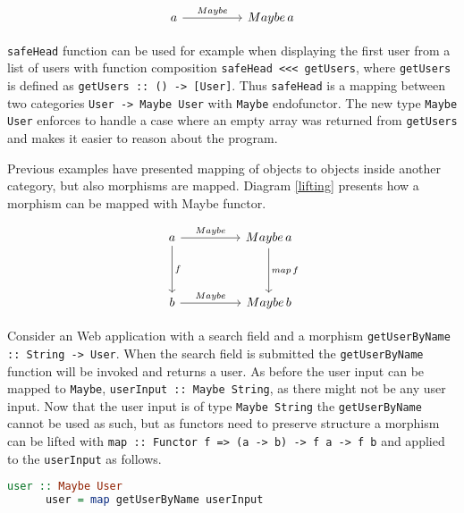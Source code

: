 \documentclass[article]{aaltoseries}
\begin{document}
    \begin{equation}
      \label{mapping}
      \begin{tikzcd}[row sep=huge, column sep=huge]
        a \arrow[r, "Maybe"]
        & Maybe\, a
      \end{tikzcd}
    \end{equation}

    \lstinline|safeHead| function can be used for example when displaying the
    first user from a list of users with function composition
    \lstinline|safeHead <<< getUsers|, where \lstinline|getUsers| is defined as
    \lstinline|getUsers :: () -> [User]|. Thus \lstinline|safeHead| is a mapping
    between two categories \lstinline|User -> Maybe User| with \lstinline|Maybe|
    endofunctor. The new type \lstinline|Maybe User| enforces to handle a case
    where an empty array was returned from \lstinline|getUsers| and makes it
    easier to reason about the program.

    Previous examples have presented mapping of objects to objects inside
    another category, but also morphisms are mapped. Diagram \ref{lifting}
    presents how a morphism can be mapped with Maybe functor.

    \begin{equation}
      \label{lifting}
      \begin{tikzcd}[row sep=huge, column sep=huge]
        a \arrow[r, "Maybe"]
        \arrow[d, "f"]
        & Maybe\, a
        \arrow[d, "map\, f"]
        \\
        b \arrow[r, "Maybe"]
        & Maybe\, b
      \end{tikzcd}
    \end{equation}

    Consider an Web application with a search field and a morphism
    \lstinline|getUserByName :: String -> User|. When the search field is
    submitted the \lstinline|getUserByName| function will be invoked and returns
    a user. As before the user input can be mapped to \lstinline|Maybe|,
    \lstinline|userInput :: Maybe String|, as there might not be any user input.
    Now that the user input is of type \lstinline|Maybe String| the
    \lstinline|getUserByName| cannot be used as such, but as functors need to
    preserve structure a morphism can be lifted with
    \lstinline|map :: Functor f => (a -> b) -> f a -> f b| and applied to the
    \lstinline|userInput| as follows. 

    \begin{lstlisting}[language=Haskell]
      user :: Maybe User
      user = map getUserByName userInput
    \end{lstlisting}
\end{document}
